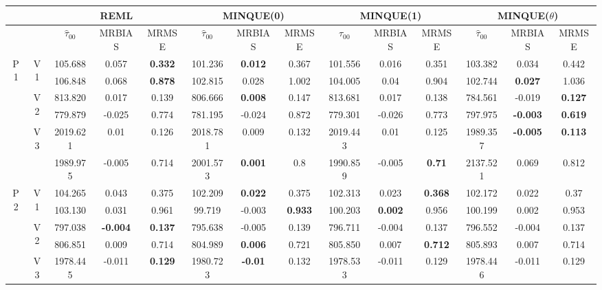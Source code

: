 \documentclass[12pt,a4paper]{article}
\begin{document}
\begin{sidewaystable}[ht]
\centering
{\footnotesize
\begin{tabular}{cc|ccc|ccc|ccc|ccc|}
   & & \multicolumn{3}{c|}{REML}&\multicolumn{3}{c|}{MINQUE(0)}&\multicolumn{3}{c|}{MINQUE(1)}&\multicolumn{3}{c|}{MINQUE($\theta$)}\\ \hline
 &  & $\hat{\tau}_{00}$ & MRBIAS & MRMSE & $\hat{\tau}_{00}$ & MRBIAS & MRMSE & $\hat{\tau}_{00}$ & MRBIAS & MRMSE & $\hat{\tau}_{00}$ & MRBIAS & MRMSE \\ 
  \hline
\multirow{6}{*}{P1} & \multirow{2}{*}{V1} & 105.688 & 0.057 & \textbf{0.332} & 101.236 & \textbf{0.012} & 0.367 & 101.556 & 0.016 & 0.351 & 103.382 & 0.034 & 0.442 \\ 
   &  & 106.848 & 0.068 & \textbf{0.878} & 102.815 & 0.028 & 1.002 & 104.005 & 0.04 & 0.904 & 102.744 & \textbf{0.027} & 1.036 \\ 
   & \multirow{2}{*}{V2} & 813.820 & 0.017 & 0.139 & 806.666 & \textbf{0.008} & 0.147 & 813.681 & 0.017 & 0.138 & 784.561 & -0.019 & \textbf{0.127} \\ 
   &  & 779.879 & -0.025 & 0.774 & 781.195 & -0.024 & 0.872 & 779.301 & -0.026 & 0.773 & 797.975 & \textbf{-0.003} & \textbf{0.619} \\ 
   & \multirow{2}{*}{V3} & 2019.621 & 0.01 & 0.126 & 2018.781 & 0.009 & 0.132 & 2019.443 & 0.01 & 0.125 & 1989.357 & \textbf{-0.005} & \textbf{0.113} \\ 
   &  & 1989.975 & -0.005 & 0.714 & 2001.573 & \textbf{0.001} & 0.8 & 1990.859 & -0.005 & \textbf{0.71} & 2137.521 & 0.069 & 0.812 \\ 
   \hline \hline\multirow{6}{*}{P2} & \multirow{2}{*}{V1} & 104.265 & 0.043 & 0.375 & 102.209 & \textbf{0.022} & 0.375 & 102.313 & 0.023 & \textbf{0.368} & 102.172 & 0.022 & 0.37 \\ 
   &  & 103.130 & 0.031 & 0.961 & 99.719 & -0.003 & \textbf{0.933} & 100.203 & \textbf{0.002} & 0.956 & 100.199 & 0.002 & 0.953 \\ 
   & \multirow{2}{*}{V2} & 797.038 & \textbf{-0.004} & \textbf{0.137} & 795.638 & -0.005 & 0.139 & 796.711 & -0.004 & 0.137 & 796.552 & -0.004 & 0.137 \\ 
   &  & 806.851 & 0.009 & 0.714 & 804.989 & \textbf{0.006} & 0.721 & 805.850 & 0.007 & \textbf{0.712} & 805.893 & 0.007 & 0.714 \\ 
   & \multirow{2}{*}{V3} & 1978.445 & -0.011 & \textbf{0.129} & 1980.723 & \textbf{-0.01} & 0.132 & 1978.533 & -0.011 & 0.129 & 1978.446 & -0.011 & 0.129 \\ 

\end{tabular}}
\end{sidewaystable}
\end{document}
